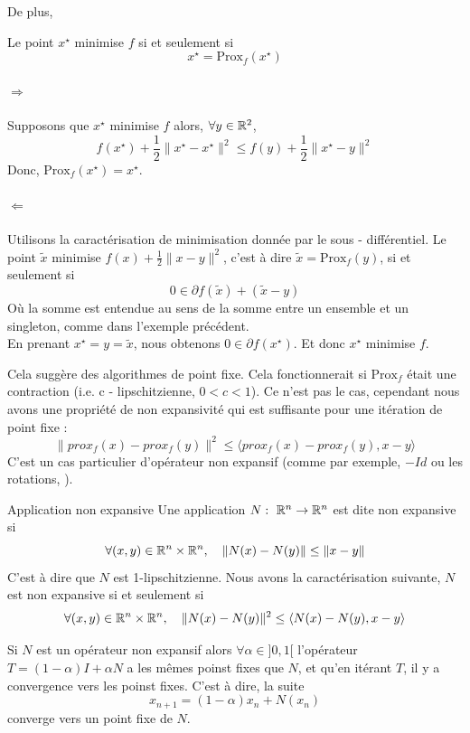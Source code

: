 \documentclass[a4paper,12pt]{article}
\newcommand{\prox}{\text{Prox}}
\begin{document}
De plus, 
\begin{propriete}
Le point $x^{\star}$ minimise $f$ si et seulement si 
$$
x^{\star} = \prox_f(x^{\star})
$$
\end{propriete} 
\begin{preuve}
\vspace{-1cm}
\paragraph{$\Rightarrow$} Supposons que $x^{\star}$ minimise $f$ alors, $\forall y\in\mathbb{R}^2$,
$$
f(x^{\star}) +\frac{1}{2}\|x^{\star}-x^{\star}\|^2\leq f(y)+\frac{1}{2}\|x^{\star}-y\|^2
$$
Donc, $\prox_f(x^{\star}) = x^{\star}$.
\paragraph{$\Leftarrow$} Utilisons la caractérisation de minimisation donnée par le sous - différentiel. Le point $\tilde{x}$ minimise $f(x) +\frac{1}{2}\|x-y\|^2$, c'est à dire $\tilde{x} = \prox_f(y)$, si et seulement si 
$$
0\in \partial f(\tilde{x}) + (\tilde{x}-y)
$$
Où la somme est entendue au sens de la somme entre un ensemble et un singleton, comme dans l'exemple précédent. \\
En prenant $x^{\star} = y=\tilde{x}$, nous obtenons $0\in\partial f(x^{\star})$. Et donc $x^{\star}$ minimise $f$.
\end{preuve}

Cela suggère des algorithmes de point fixe. Cela fonctionnerait si $\prox_f$ était une contraction (i.e. c - lipschitzienne, $0<c<1$). Ce n'est pas le cas, cependant nous avons une propriété de non expansivité qui est suffisante pour une itération de point fixe : 
$$
\|prox_f(x)-prox_f(y)\|^2\leq \langle prox_f(x)-prox_f(y),x-y\rangle
$$
C'est un cas particulier d'opérateur non expansif (comme par exemple, $-Id$ ou les rotations, \cite{browder1965nonexpansive,brezis1973ope}). 
\begin{definition}{Application non expansive}
Une application $N:\ \mathbb{R}^n\rightarrow \mathbb{R}^n$ est dite non expansive si 
$$
\forall (x,y)\in\mathbb{R}^n\times\mathbb{R}^n,\quad \|N(x)-N(y)\| \leq \|x-y\|
$$
C'est à dire que $N$ est 1-lipschitzienne. Nous avons la caractérisation suivante, $N$ est non expansive si et seulement si 
$$
\forall (x,y)\in\mathbb{R}^n\times\mathbb{R}^n,\quad \|N(x)-N(y)\|^2 \leq  \langle N(x)-N(y),x-y\rangle
$$
\end{definition}

Si $N$ est un opérateur non expansif alors $\forall \alpha \in ]0,1[$ l'opérateur $T = (1-\alpha)I + \alpha N$ a les mêmes poinst fixes que $N$, et qu'en itérant $T$, il y a convergence vers les poinst fixes. C'est à dire, la suite 
$$
x_{n+1} = (1-\alpha )x_n +N(x_n)
$$
converge vers un point fixe de $N$.
\end{document}
